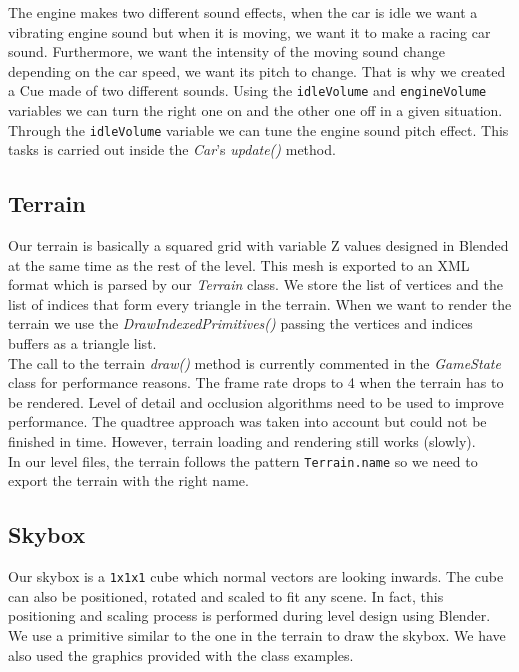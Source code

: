 

The engine makes two different sound effects, when the car is idle we want a vibrating engine
sound but when it is moving, we want it to make a racing car sound. Furthermore, we want
the intensity of the moving sound change depending on the car speed, we want its pitch to change.
That is why we created a Cue made of two different sounds. Using the \texttt{idleVolume} and
\texttt{engineVolume} variables we can turn the right one on and the other one off in a given
situation. Through the \texttt{idleVolume} variable we can tune the engine sound pitch effect.
This tasks is carried out inside the \textit{Car}'s \textit{update()} method.



\subsection{Terrain}
\label{sec:terrain}

Our terrain is basically a squared grid with variable Z values designed in Blended at the
same time as the rest of the level. This mesh is exported to an XML format which is parsed
by our \textit{Terrain} class. We store the list of vertices and the list of indices that
form every triangle in the terrain. When we want to render the terrain we use the
\textit{DrawIndexedPrimitives()} passing the vertices and indices buffers as a triangle list.\\

The call to the terrain \textit{draw()} method is currently commented in the \textit{GameState}
class for performance reasons. The frame rate drops to 4 when the terrain has to be rendered.
Level of detail and occlusion algorithms need to be used to improve performance. The quadtree
approach was taken into account but could not be finished in time. However, terrain loading and
rendering still works (slowly).\\

In our level files, the terrain follows the pattern \texttt{Terrain.name} so we need to 
export the terrain with the right name.\\

\subsection{Skybox}

Our skybox is a \texttt{1x1x1} cube which normal vectors are looking inwards. The cube can also
be positioned, rotated and scaled to fit any scene. In fact, this positioning and scaling process
is performed during level design using Blender. We use a primitive similar to the one in the
terrain to draw the skybox. We have also used the graphics provided with the class examples.\\